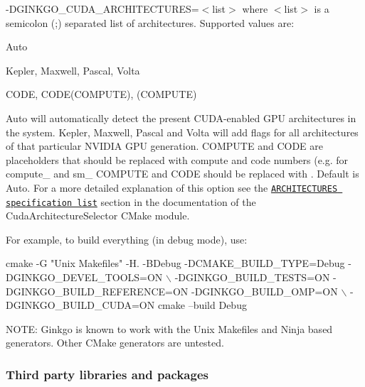 \begin{DoxyItemize}
\item {\ttfamily -\/\+D\+G\+I\+N\+K\+G\+O\+\_\+\+C\+U\+D\+A\+\_\+\+A\+R\+C\+H\+I\+T\+E\+C\+T\+U\+R\+ES=$<$list$>$} where {\ttfamily $<$list$>$} is a semicolon ({\ttfamily ;}) separated list of architectures. Supported values are\+:
\begin{DoxyItemize}
\item {\ttfamily Auto}
\item {\ttfamily Kepler}, {\ttfamily Maxwell}, {\ttfamily Pascal}, {\ttfamily Volta}
\item {\ttfamily C\+O\+DE}, {\ttfamily C\+O\+D\+E(\+C\+O\+M\+P\+U\+T\+E)}, {\ttfamily (C\+O\+M\+P\+U\+TE)}
\end{DoxyItemize}

{\ttfamily Auto} will automatically detect the present C\+U\+D\+A-\/enabled G\+PU architectures in the system. {\ttfamily Kepler}, {\ttfamily Maxwell}, {\ttfamily Pascal} and {\ttfamily Volta} will add flags for all architectures of that particular N\+V\+I\+D\+IA G\+PU generation. {\ttfamily C\+O\+M\+P\+U\+TE} and {\ttfamily C\+O\+DE} are placeholders that should be replaced with compute and code numbers (e.\+g. for {\ttfamily compute\+\_} and {\ttfamily sm\+\_} {\ttfamily C\+O\+M\+P\+U\+TE} and {\ttfamily C\+O\+DE} should be replaced with {}. Default is {\ttfamily Auto}. For a more detailed explanation of this option see the \href{https://github.com/ginkgo-project/CudaArchitectureSelector/blob/master/CudaArchitectureSelector.cmake#L58}{\tt {\ttfamily A\+R\+C\+H\+I\+T\+E\+C\+T\+U\+R\+ES} specification list} section in the documentation of the Cuda\+Architecture\+Selector C\+Make module.
\end{DoxyItemize}

For example, to build everything (in debug mode), use\+:


\begin{DoxyCode}
cmake  -G "Unix Makefiles" -H. -BDebug -DCMAKE\_BUILD\_TYPE=Debug -DGINKGO\_DEVEL\_TOOLS=ON \(\backslash\)
      -DGINKGO\_BUILD\_TESTS=ON -DGINKGO\_BUILD\_REFERENCE=ON -DGINKGO\_BUILD\_OMP=ON \(\backslash\)
      -DGINKGO\_BUILD\_CUDA=ON 
cmake --build Debug
\end{DoxyCode}


N\+O\+TE\+: Ginkgo is known to work with the {\ttfamily Unix Makefiles} and {\ttfamily Ninja} based generators. Other C\+Make generators are untested.

\subsubsection*{Third party libraries and packages}

